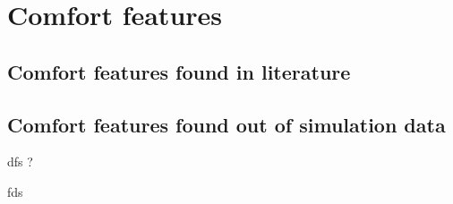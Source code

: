 \documentclass[main_adjusted]{subfiles}
\begin{document}
\chapter{Comfort features}
\label{cha:comfort features}

\section{Comfort features found in literature}
\label{Different comfort features found in literature}


\section{Comfort features found out of simulation data}
\label{Different comfort features found in literature}
dfs  ? 

 fds 
\end{document}

